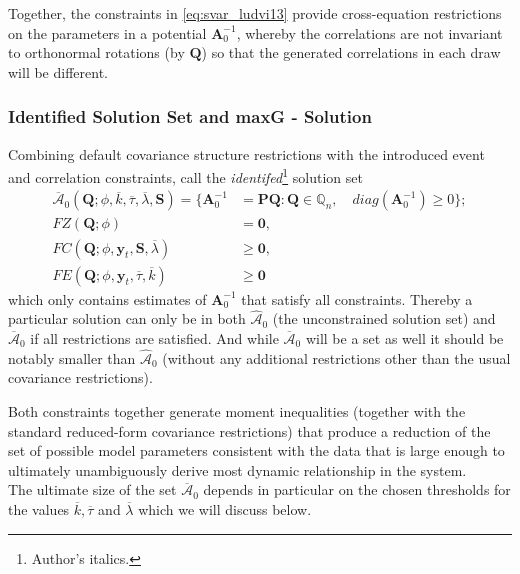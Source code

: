 \documentclass[a4paper,11pt,listof=nochaptergap,oneside,pointednumbers,bibtotoc,bigheadings,liststotoc,hidelinks]{scrbook}
\theoremstyle{mysatz}
\theoremstyle{mydefinition}
\theoremstyle{mytheorem}
\theoremstyle{mybemerkung}
\let\oldhat\hat
\newcommand{\vect}[1]{\boldsymbol{\mathbf{#1}}}
\newcommand{\hatt}[1]{\oldhat{\boldsymbol{\mathbf{#1}}}}
\begin{document}
Together, the constraints in \ref{eq:svar_ludvi13} provide cross-equation restrictions on the parameters in a potential $\vect{A}_0^{-1}$, whereby the correlations are not invariant to orthonormal rotations (by $\vect{Q}$) so that the generated correlations in each draw will be different. 

\subsubsection{Identified Solution Set and maxG - Solution}
Combining default covariance structure restrictions with the introduced event and correlation constraints, \citet{ludvigsonetal:18} call the \textit{identifed}\footnote{Author's italics.} solution set 
\begin{equation} \label{eq:svar_ludvi14}
\begin{split}
\overline{\vect{\mathcal{A}}}_0(\vect{Q}; \phi, \overline{k}, \overline{\tau}, \overline{\lambda}, \vect{S})  = \{\vect{A}_0^{-1} & = \vect{P}\vect{Q}: \vect{Q} \in \mathbb{Q}_n, \quad diag(\vect{A}_0^{-1}) \geq 0\}; \\
			FZ(\vect{Q}; \phi) & = \vect{0}, \\
			FC(\vect{Q}; \phi, \vect{y}_t, \vect{S}, \overline{\lambda}) & \geq \vect{0}, \\
			FE(\vect{Q}; \phi, \vect{y}_t, \overline{\tau}, \overline{k}) & \geq \vect{0}
\end{split}								
\end{equation}
which only contains estimates of $\vect{A}_0^{-1}$ that satisfy all constraints. Thereby a particular solution can only be in both $\hatt{\mathcal{A}}_0$ (the unconstrained solution set) and $\overline{\vect{\mathcal{A}}}_0$ if all restrictions are satisfied. And while $\overline{\vect{\mathcal{A}}}_0$ will be a set as well it should be notably smaller than $\hatt{\mathcal{A}}_0$ (without any additional restrictions other than the usual covariance restrictions).

Both constraints together generate moment inequalities (together with the standard reduced-form covariance restrictions) that produce a reduction of the set of possible model parameters consistent with the data that is large enough to ultimately unambiguously derive most dynamic relationship in the system.\\

The ultimate size of the set $\overline{\vect{\mathcal{A}}}_0$ depends in particular on the chosen thresholds for the values $\overline{k}, \overline{\tau}$ and $\overline{\lambda}$ which we will discuss below.
\end{document}
